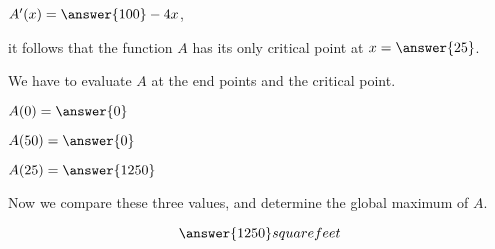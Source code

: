 \documentclass{ximera}
\begin{document}
\begin{exercise}
\begin{hint}
$A'(x)=\answer{100}-4x$,

it follows that  the function $A$ has its only critical point at $x=\answer{25}$.

\end{hint}
\begin{hint}
We have to evaluate $A$ at the end points and the critical point.

$A(0)=\answer{0}$

$A(50)=\answer{0}$

$A(25)=\answer{1250}$

Now we compare these three values, and determine the global maximum of $A$.
\end{hint}
  \begin{prompt}
  \[
  \answer{1250} square feet
  \]
  \end{prompt}
\end{exercise}
\end{document}
